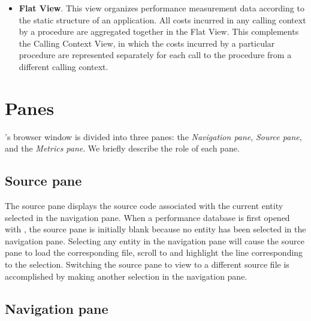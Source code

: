 \begin{itemize}
\item \textbf{Flat View}.
  This view organizes performance measurement data according to the static structure of an application.
  All costs incurred in any calling context by a procedure are aggregated together in the Flat View.
  This complements the Calling Context View, in which the costs incurred by a particular procedure are represented separately for each call to the procedure from a different calling context.

\end{itemize}



\section{Panes}
\label{sec:hpcviewer:panes}

\hpcviewer{}'s browser window is divided into three panes: the \emph{Navigation pane}, \emph{Source pane}, and the \emph{Metrics pane}.
We briefly describe the role of each pane.


\subsection{Source pane}
\label{sec:pane-source}

The source pane displays the source code associated with the current entity selected in the navigation pane.
When a performance database is first opened with \hpcviewer{}, the source pane is initially blank because no entity has been selected in the navigation pane.
Selecting any entity in the navigation pane will cause the source pane to load the corresponding file, scroll to and highlight the line corresponding to the selection.
Switching the source pane to view to a different source file is accomplished by making another selection in the navigation pane.


\subsection{Navigation pane}

